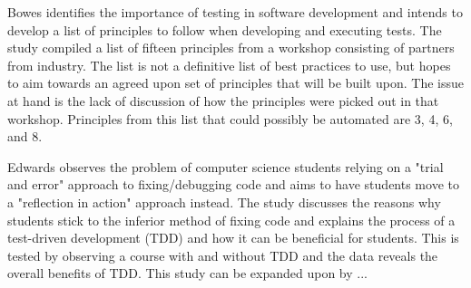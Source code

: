 \documentclass[10pt,sigconf]{acmart}
\begin{document}
Bowes \cite{bowes-2017} identifies the importance of testing in software development and intends to develop a list of principles to follow when developing and executing tests. The study compiled a list of fifteen principles from a workshop consisting of partners from industry. The list is not a definitive list of best practices to use, but hopes to aim towards an agreed upon set of principles that will be built upon. The issue at hand is the lack of discussion of how the principles were picked out in that workshop. Principles from this list that could possibly be automated are 3, 4, 6, and 8.

Edwards \cite{edwards-2004} observes the problem of computer science students relying on a "trial and error" approach to fixing/debugging code and aims to have students move to a "reflection in action" approach instead. The study discusses the reasons why students stick to the inferior method of fixing code and explains the process of a test-driven development (TDD) and how it can be beneficial for students. This is tested by observing a course with and without TDD and the data reveals the overall benefits of TDD. This study can be expanded upon by ...




\end{document}
